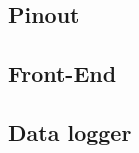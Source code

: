 \documentclass[12pt,a4paper,titlepage,oneside]{article}
\begin{document}
\subsection{Pinout}


\subsection{Front-End}


\subsection{Data logger}




\clearpage 
{}
{}


\printindex
\printindex
\end{document}
